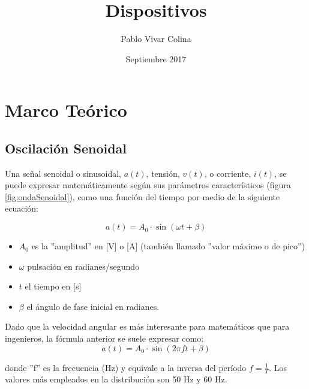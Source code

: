 \documentclass{article}
\title{Dispositivos}
\author{Pablo Vivar Colina}
\date{Septiembre 2017}
\begin{document}
\tableofcontents  %

\listoffigures  %


\section{Marco Teórico}

\subsection{Oscilación Senoidal}

Una señal senoidal o sinusoidal, $a(t)$, tensión, $v(t)$, o corriente, $i(t)$, se puede expresar matemáticamente según sus parámetros característicos (figura \ref{fig:ondaSenoidal}), como una función del tiempo por medio de la siguiente ecuación:\citep{CA}

\begin{equation}
    a(t)=A_0 \cdot \sin(\omega t + \beta)
\end{equation}
\begin{itemize}
    \item $A_0$ es la ''amplitud'' en [V] o [A] (también llamado ''valor máximo o de pico'')
    
    \item $\omega$  pulsación en radianes/segundo
    
    \item $t$ el tiempo en [s]
    
    \item $\beta$ el ángulo de fase inicial en radianes.
\end{itemize}


Dado que la velocidad angular es más interesante para matemáticos que para ingenieros, la fórmula anterior se suele expresar como:\citep{CA}\\

\begin{equation}
    a(t)=A_0 \cdot \sin(2 \pi f t + \beta)
\end{equation}


donde ''f'' es la frecuencia (Hz) y equivale a la inversa del período $f=\frac{1}{T}$. Los valores más empleados en la distribución son 50 Hz y 60 Hz.\citep{CA}\\
\end{document}
